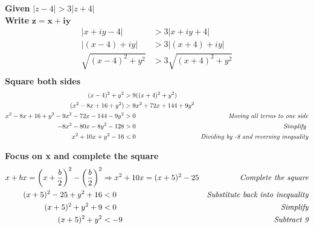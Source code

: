 \documentclass[a4paper, 8pt]{extarticle}
\begin{document}
\begin{examplebox}[2023 Q1(a)]

    \textbf{Given} $|z - 4| > 3|z+4|$ \\
    \textbf{Write} $\boldsymbol{z = x + iy}$
    \begin{align*}
        | x + iy -4|         & > 3 |x + iy + 4|         \\
        | (x - 4) + iy|      & > 3 |(x + 4) + iy|       \\
        \sqrt{(x-4)^2 + y^2} & > 3 \sqrt{(x+4)^2 + y^2} \\
    \end{align*}
    \textbf{Square both sides}
    \begin{align*}
        (x-4)^2 + y^2                                 & > 9((x+4)^2 + y^2)                                                         \\
        (x^2 - 8x + 16 + y^2)                         & > 9x^2 + 72x + 144 + 9y^2                                                  \\
        x^2 - 8x + 16 + y^2 - 9x^2 - 72x - 144 - 9y^2 & > 0                       & \emph{Moving all terms to one side}            \\
        -8x^2 - 80x - 8y^2 - 128                      & > 0                       & \emph{Simplify }                               \\
        x^2 + 10x + y^2 - 16                          & < 0                       & \emph{Dividing by -8 and reversing inequality} \\
    \end{align*}

    \textbf{Focus on x and complete the square}
    \begin{align*}
        x + bx                   = \left(x + \frac{b}{2}\right)^2 - \left(\frac{b}{2}\right)^2 & \Rightarrow  x^2 + 10x = (x + 5)^2 - 25 & \emph{Complete the square}             \\
        (x+5)^2 - 25 + y^2 + 16                                                                & < 0                                     & \emph{Substitute back into inequality} \\
        (x+5)^2 + y^2 + 9                                                                      & < 0                                     & \emph{Simplify}                        \\
        (x+5)^2 + y^2                                                                          & < -9                                    & \emph{Subtract 9}                      \\
    \end{align*}


\end{examplebox}
\end{document}
